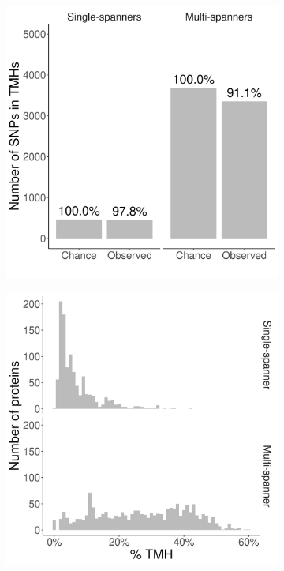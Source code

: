 \begin{figure}[!htbp]
  \begin{subfigure}[t]{0.45\textwidth}
    \centering
    \caption{}
    \includegraphics[width=\linewidth]{ncbi_peregrine_results/fig_conservation_per_spanner.png}
    \label{fig:conservation_per_spanner}
  \end{subfigure}
  \hfill
  \begin{subfigure}[t]{0.45\textwidth}
    \centering
    \caption{}
    \includegraphics[width=\linewidth]{ncbi_peregrine_results/fig_f_tmh_ncbi_per_spanner.png}
    \label{fig:f_tmh_ncbi_per_spanner}
  \end{subfigure}  
  

\end{figure}
